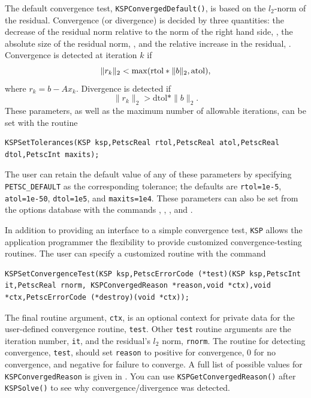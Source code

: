 The default convergence test, \lstinline{KSPConvergedDefault()}, is
based on the $l_2$-norm of the residual. Convergence
(or divergence) is decided by three quantities:
the decrease of the residual norm relative to the norm of the right hand side, , the absolute
size of the residual norm, , and the relative increase in the
residual, .  Convergence is detected at iteration $ k $ if
\[  \| r_k \|_2 < {\rm max} ( \text{rtol} * \| b \|_2, \text{atol}), \]
where $r_k = b - A x_k$.  Divergence is detected if
\[  \| r_k \|_2 > \text{dtol} * \| b \|_2. \]
These parameters, as well as the maximum number of allowable iterations,
can be set with the routine
\begin{lstlisting}
KSPSetTolerances(KSP ksp,PetscReal rtol,PetscReal atol,PetscReal dtol,PetscInt maxits);
\end{lstlisting}
The user can retain the default value of any of these parameters by
specifying \lstinline{PETSC_DEFAULT} as the
corresponding tolerance; the
defaults are \lstinline{rtol=1e-5}, \lstinline{atol=1e-50},
\lstinline{dtol=1e5}, and \lstinline{maxits=1e4}.
These parameters can also be set from the options database with the
commands  ,  ,  ,
  
and  . 

In addition to providing an interface to a simple convergence test,
\lstinline{KSP} allows the application programmer the flexibility to provide
customized convergence-testing routines.  
The user can specify a customized
routine with the command
\begin{lstlisting}
KSPSetConvergenceTest(KSP ksp,PetscErrorCode (*test)(KSP ksp,PetscInt it,PetscReal rnorm, KSPConvergedReason *reason,void *ctx),void *ctx,PetscErrorCode (*destroy)(void *ctx));
\end{lstlisting}
The final routine argument, \lstinline{ctx}, is an optional context for private
data for the user-defined convergence routine, \lstinline{test}.  Other
\lstinline{test} routine arguments are the iteration
number, \lstinline{it}, and the residual's $ l_2 $ norm, \lstinline{rnorm}.
The routine for detecting convergence, \lstinline{test}, should set \lstinline{reason} to
positive for convergence, 0 for no convergence, and negative for
failure to converge.  A full list of possible values for \lstinline{KSPConvergedReason} is given in .
 You can use \lstinline{KSPGetConvergedReason()} after \lstinline{KSPSolve()} to see why
convergence/divergence was detected.

